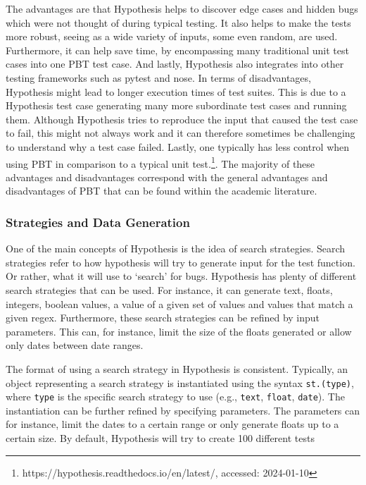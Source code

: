 \documentclass[runningheads]{llncs}
\begin{document}
The advantages are that Hypothesis helps to discover edge cases and hidden bugs which were not thought of during typical testing. It also helps to make the tests more robust, seeing as a wide variety of inputs, some even random, are used.
Furthermore, it can help save time, by encompassing many traditional unit test cases into one PBT test case. And lastly, Hypothesis also integrates into other testing frameworks such as pytest and nose. In terms of disadvantages, Hypothesis might lead to longer execution times of test suites. This is due to a Hypothesis test case generating many more subordinate test cases and running them. Although Hypothesis tries to reproduce the input that caused the test case to fail, this might not always work and it can therefore sometimes be challenging to understand why a test case failed.
Lastly, one typically has less control when using PBT in comparison to a typical unit test.\footnote{https://hypothesis.readthedocs.io/en/latest/, accessed: 2024-01-10}. The majority of these advantages and disadvantages correspond with the general advantages and disadvantages of PBT that can be found within the academic literature.

\subsubsection{Strategies and Data Generation}
One of the main concepts of Hypothesis is the idea of search strategies. Search strategies refer to how hypothesis will try to generate input for the test function. Or rather, what it will use to `search' for bugs. Hypothesis has plenty of different search strategies that can be used. For instance, it can generate text, floats, integers, boolean values, a value of a given set of values and values that match a given regex. Furthermore, these search strategies can be refined by input parameters. This can, for instance, limit the size of the floats generated or allow only dates between date ranges.

The format of using a search strategy in Hypothesis is consistent. Typically, an object representing a search strategy is instantiated using the syntax \texttt{st.(type)}, where \texttt{type} is the specific search strategy to use (e.g., \texttt{text}, \texttt{float}, \texttt{date}). The instantiation can be further refined by specifying parameters. The parameters can for instance, limit the dates to a certain range or only generate floats up to a certain size. By default, Hypothesis will try to create 100 different tests
\end{document}

